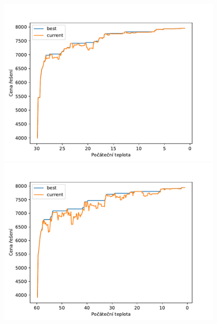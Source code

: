 \documentclass[11pt]{article}
\begin{document}
\begin{figure}
	\centering
    \begin{minipage}[c]{0.325\textwidth}
        \centering\includegraphics[width=\textwidth]{img/T30.pdf} 
    \end{minipage}
    \begin{minipage}[c]{0.325\textwidth}
        \centering \includegraphics[width=\textwidth]{img/T60.pdf} 
    \end{minipage}
    \begin{minipage}[c]{0.325\textwidth}

\end{minipage}
\end{figure}
\end{document}
